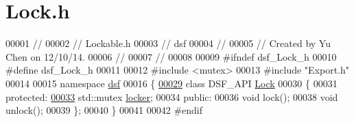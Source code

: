 \hypertarget{_lock_8h_source}{}\section{Lock.\+h}
\label{_lock_8h_source}

\begin{DoxyCode}
00001 \textcolor{comment}{//}
00002 \textcolor{comment}{//  Lockable.h}
00003 \textcolor{comment}{//  dsf}
00004 \textcolor{comment}{//}
00005 \textcolor{comment}{//  Created by Yu Chen on 12/10/14.}
00006 \textcolor{comment}{//}
00007 \textcolor{comment}{//}
00008 
00009 \textcolor{preprocessor}{#ifndef dsf\_Lock\_h}
00010 \textcolor{preprocessor}{#define dsf\_Lock\_h}
00011 
00012 \textcolor{preprocessor}{#include <mutex>}
00013 \textcolor{preprocessor}{#include "Export.h"}
00014 
00015 \textcolor{keyword}{namespace }\hyperlink{namespacedsf}{dsf}
00016 \{
\hypertarget{_lock_8h_source_l00029}{}\hyperlink{classdsf_1_1_lock}{00029}     \textcolor{keyword}{class }DSF\_API \hyperlink{classdsf_1_1_lock}{Lock}
00030     \{
00031     \textcolor{keyword}{protected}:
\hypertarget{_lock_8h_source_l00033}{}\hyperlink{classdsf_1_1_lock_a605f27e33e37dc8b3b920a3272461c44}{00033}         std::mutex \hyperlink{classdsf_1_1_lock_a605f27e33e37dc8b3b920a3272461c44}{locker};
00034     \textcolor{keyword}{public}:
00036         \textcolor{keywordtype}{void} lock();
00038         \textcolor{keywordtype}{void} unlock();
00039     \};
00040 \}
00041 
00042 \textcolor{preprocessor}{#endif}
\end{DoxyCode}
